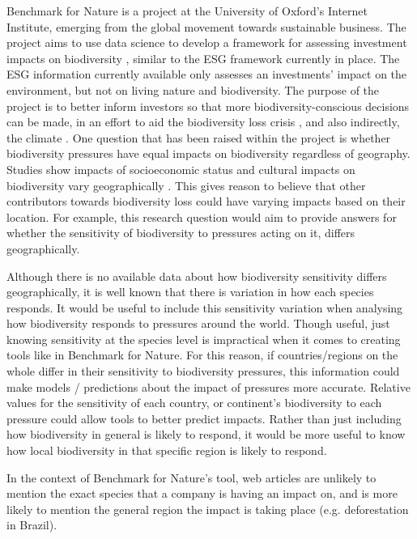 \documentclass[11pt, a4paper, titlepage]{article}
\begin{document}
   	 Benchmark for Nature is a project at the University of Oxford's Internet Institute, emerging from the global movement towards sustainable business. The project aims to use data science to develop a framework for assessing investment impacts on biodiversity \cite{iccs_2020}, similar to the ESG framework currently in place. The ESG information currently available only assesses an investments' impact on the environment, but not on living nature and biodiversity. The purpose of the project is to better inform investors so that more biodiversity-conscious decisions can be made, in an effort to aid the biodiversity loss crisis \cite{gasu2021review}, and also indirectly, the climate \cite{shin2022actions}.
   	 \newline
   	 \newline
   	  One question that has been raised within the project is whether biodiversity pressures have equal impacts on biodiversity regardless of geography. Studies show impacts of socioeconomic status and cultural impacts on biodiversity vary geographically \cite{kinzig2005effects}. This gives reason to believe that other contributors towards biodiversity loss could have varying impacts based on their location. For example, this research question would aim to provide answers for whether the sensitivity of biodiversity to pressures acting on it, differs geographically. \newline
   	 
   	 
   	 Although there is no available data about how biodiversity sensitivity differs geographically, it is well known that there is variation in how each species responds. It would be useful to include this sensitivity variation when analysing how biodiversity responds to pressures around the world. Though useful, just knowing sensitivity at the species level is impractical when it comes to creating tools like in Benchmark for Nature. For this reason, if countries/regions on the whole differ in their sensitivity to biodiversity pressures, this information could make models / predictions about the impact of pressures more accurate. Relative values for the sensitivity of each country, or continent's biodiversity to each pressure could allow tools to better predict impacts. Rather than just including how biodiversity in general is likely to respond, it would be more useful to know how local biodiversity in that specific region is likely to respond. \newline
   	 
   	 In the context of Benchmark for Nature's tool, web articles are unlikely to mention the exact species that a company is having an impact on, and is more likely to mention the general region the impact is taking place (e.g. deforestation in Brazil). 
   	 
\end{document}
